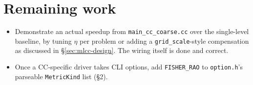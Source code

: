 \documentclass[11pt]{article}
\begin{document}
\section{Remaining work}

\begin{itemize}[nosep]
  \item Demonstrate an actual speedup from \texttt{main\_cc\_coarse.cc} over the
        single-level baseline, by tuning $\eta$ per problem or adding a
        \texttt{grid\_scale}-style compensation as discussed in
        \S\ref{sec:mlcc-design}. The wiring itself is done and correct.
  \item Once a CC-specific driver takes CLI options, add \texttt{FISHER\_RAO} to
        \texttt{option.h}'s parseable \texttt{MetricKind} list (\S 2).
\end{itemize}
\end{document}
